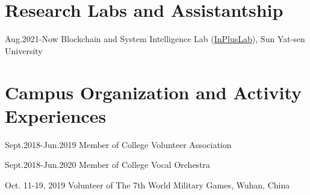 \documentclass[12pt,letterpaper]{report}
\newcommand{\listitemspace}{0.25em}
\renewenvironment{itemize}
{\begin{list}{}{\setlength{\leftmargin}{0em}
                \setlength{\parskip}{0em}
                \setlength{\itemsep}{\listitemspace}
                \setlength{\parsep}{\listitemspace}}}
{\end{list}}
\begin{document}

    \section*{Research Labs and Assistantship}
    \begin{tablist}
        \item[Aug.2021-Now] \tab{}Blockchain and System Intelligence Lab (\href{http://www.inpluslab.com}{InPlusLab}), Sun Yat-sen University
    \end{tablist}


    \section*{Campus Organization and Activity Experiences}
    \begin{tablist}
        \item[Sept.2018-Jun.2019] \tab{}Member of College Volunteer Association
        \item[Sept.2018-Jun.2020] \tab{}Member of College Vocal Orchestra
        \item[Oct. 11-19, 2019] \tab{}Volunteer of The 7th World Military Games, Wuhan, China
    \end{tablist}
\end{document}
